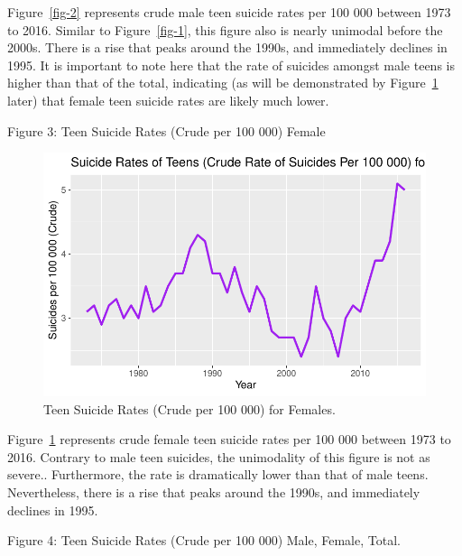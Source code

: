 \documentclass[
  letterpaper,
  DIV=11,
  numbers=noendperiod]{scrartcl}
\begin{document}
Figure~\ref{fig-2} represents crude male teen suicide rates per 100 000
between 1973 to 2016. Similar to Figure~\ref{fig-1}, this figure also is
nearly unimodal before the 2000s. There is a rise that peaks around the
1990s, and immediately declines in 1995. It is important to note here
that the rate of suicides amongst male teens is higher than that of the
total, indicating (as will be demonstrated by Figure~\ref{fig-3} later)
that female teen suicide rates are likely much lower.

Figure 3: Teen Suicide Rates (Crude per 100 000) Female

\begin{figure}

{\centering \includegraphics{paper_files/figure-pdf/fig-3-1.pdf}

}

\caption{\label{fig-3}Teen Suicide Rates (Crude per 100 000) for
Females.}

\end{figure}

Figure~\ref{fig-3} represents crude female teen suicide rates per 100
000 between 1973 to 2016. Contrary to male teen suicides, the
unimodality of this figure is not as severe.. Furthermore, the rate is
dramatically lower than that of male teens. Nevertheless, there is a
rise that peaks around the 1990s, and immediately declines in 1995.

Figure 4: Teen Suicide Rates (Crude per 100 000) Male, Female, Total.
\end{document}

